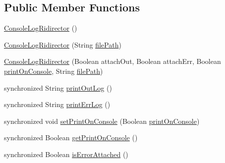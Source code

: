 \subsection*{Public Member Functions}
\begin{DoxyCompactItemize}
\item 
\hyperlink{classit_1_1emarolab_1_1cagg_1_1debugging_1_1StandaloneDebuggingText_1_1ConsoleLogRidirector_aacb3a28e0d1b20890ec8aa2fb21b61e8}{Console\-Log\-Ridirector} ()
\item 
\hyperlink{classit_1_1emarolab_1_1cagg_1_1debugging_1_1StandaloneDebuggingText_1_1ConsoleLogRidirector_a4241ba7bd634ec0f72d005fc0c56c69e}{Console\-Log\-Ridirector} (String \hyperlink{classit_1_1emarolab_1_1cagg_1_1debugging_1_1StandaloneDebuggingText_1_1ConsoleLogRidirector_a870d183ab1015b37ba316062225c5ea5}{file\-Path})
\item 
\hyperlink{classit_1_1emarolab_1_1cagg_1_1debugging_1_1StandaloneDebuggingText_1_1ConsoleLogRidirector_a697b76aa82e5209a1f2c98a7faaa56d6}{Console\-Log\-Ridirector} (Boolean attach\-Out, Boolean attach\-Err, Boolean \hyperlink{classit_1_1emarolab_1_1cagg_1_1debugging_1_1StandaloneDebuggingText_1_1ConsoleLogRidirector_ac20283258cc8819bfb23d5ae5aed23f9}{print\-On\-Console}, String \hyperlink{classit_1_1emarolab_1_1cagg_1_1debugging_1_1StandaloneDebuggingText_1_1ConsoleLogRidirector_a870d183ab1015b37ba316062225c5ea5}{file\-Path})
\item 
synchronized String \hyperlink{classit_1_1emarolab_1_1cagg_1_1debugging_1_1StandaloneDebuggingText_1_1ConsoleLogRidirector_ad30742574f8fa8a285d501852da0e4bd}{print\-Out\-Log} ()
\item 
synchronized String \hyperlink{classit_1_1emarolab_1_1cagg_1_1debugging_1_1StandaloneDebuggingText_1_1ConsoleLogRidirector_aab82abb6fd7240f61f44df3733a20266}{print\-Err\-Log} ()
\item 
synchronized void \hyperlink{classit_1_1emarolab_1_1cagg_1_1debugging_1_1StandaloneDebuggingText_1_1ConsoleLogRidirector_a2f5220459f319b93d3b226fe5acb7ea3}{set\-Print\-On\-Console} (Boolean \hyperlink{classit_1_1emarolab_1_1cagg_1_1debugging_1_1StandaloneDebuggingText_1_1ConsoleLogRidirector_ac20283258cc8819bfb23d5ae5aed23f9}{print\-On\-Console})
\item 
synchronized Boolean \hyperlink{classit_1_1emarolab_1_1cagg_1_1debugging_1_1StandaloneDebuggingText_1_1ConsoleLogRidirector_a9886c1d3e341183e8936aa665626884c}{get\-Print\-On\-Console} ()
\item 
synchronized Boolean \hyperlink{classit_1_1emarolab_1_1cagg_1_1debugging_1_1StandaloneDebuggingText_1_1ConsoleLogRidirector_adc100c58a0b82447bcd6d082d5f58bba}{is\-Error\-Attached} ()

\end{DoxyCompactItemize}

